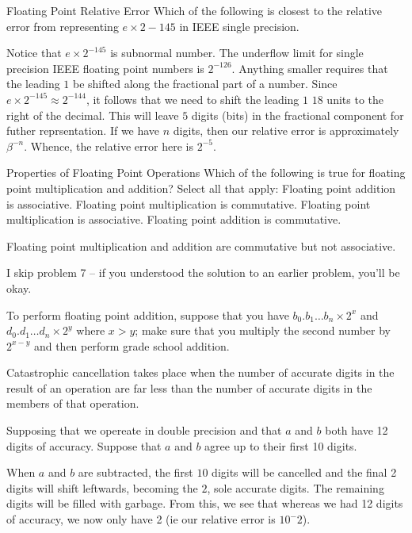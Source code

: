 \documentclass[../main.tex]{subfiles}
\begin{document}
Floating Point Relative Error
Which of the following is closest to the relative error from representing $e×2−145$ in IEEE single precision.

\begin{solution}
    Notice that $e \times 2^{-145}$ is subnormal number. The underflow limit for single precision IEEE floating point numbers is $2^{-126}$. Anything smaller requires that the leading $1$ be shifted along the fractional part of a number. Since $e \times 2^{-145} \approx 2^{-144}$, it follows that we need to shift the leading $1$ $18$ units to the right of the decimal. This will leave $5$ digits (bits) in the fractional component for futher reprsentation. If we have $n$ digits, then our relative error is approximately $\beta^{-n}$. Whence, the relative error here is $2^{-5}$.
\end{solution}

Properties of Floating Point Operations
Which of the following is true for floating point multiplication and addition?
Select all that apply:
Floating point addition is associative.
Floating point multiplication is commutative.
Floating point multiplication is associative.
Floating point addition is commutative.
\begin{solution}
    Floating point multiplication and addition are commutative but not associative.
\end{solution}

I skip problem 7 -- if you understood the solution to an earlier problem, you'll be okay.

\begin{example}
    To perform floating point addition, suppose that you have
    $b_0.b_1 \dots b_n \times 2^{x}$ and 
    $d_0.d_1 \dots d_n \times 2^{y}$ where $x > y$; make sure
    that you multiply the second number by $2^{x-y}$ and then perform grade school addition.
\end{example}

\begin{definition}
    Catastrophic cancellation takes place when the number of
    accurate digits in the result of an operation are far
    less than the number of accurate digits in the members
    of that operation.
\end{definition}

\begin{example}
    Supposing that we opereate in double precision and that
    $a$ and $b$ both have 12 digits of accuracy. Suppose
    that $a$ and $b$ agree up to their first 10 digits.

    When $a$ and $b$ are subtracted, the first $10$ digits
    will be cancelled and the final 2 digits will shift
    leftwards, becoming the $2$, sole accurate digits. The
    remaining digits will be filled with garbage. From this,
    we see that whereas we had 12 digits of accuracy, we now
    only have 2 (ie our relative error is $10^-2$).
\end{example}
\end{document}
